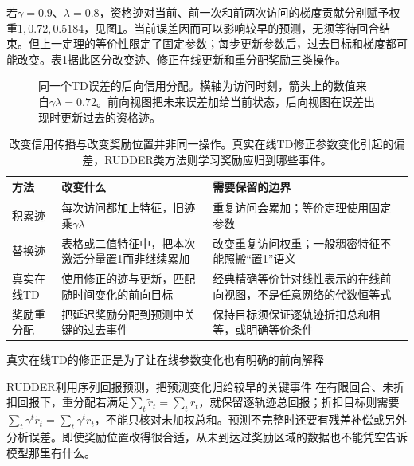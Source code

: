 若$\gamma=0.9$、$\lambda=0.8$，资格迹对当前、前一次和前两次访问的梯度贡献分别赋予权重$1,0.72,0.5184$，见图\ref{fig:rl-learning-traces}。当前误差因而可以影响较早的预测，无须等待回合结束。但上一定理的等价性限定了固定参数；每步更新参数后，过去目标和梯度都可能改变。表\ref{tab:rl-learning-trace-variants}据此区分改变迹、修正在线更新和重分配奖励三类操作。

\begin{figure}[htbp]
  \centering
  
  \caption{同一个TD误差的后向信用分配。横轴为访问时刻，箭头上的数值来自$\gamma\lambda=0.72$。前向视图把未来误差加给当前状态，后向视图在误差出现时更新过去的资格迹。}
  \label{fig:rl-learning-traces}
\end{figure}

\begin{table}[t]
  \centering
  \small
  \begin{tabularx}{\linewidth}{>{\raggedright\arraybackslash}p{26mm} >{\raggedright\arraybackslash}X >{\raggedright\arraybackslash}X}
    \toprule
    方法 & 改变什么 & 需要保留的边界 \\
    \midrule
    积累迹 & 每次访问都加上特征，旧迹乘$\gamma\lambda$ & 重复访问会累加；等价定理使用固定参数 \\
    替换迹 & 表格或二值特征中，把本次激活分量置1而非继续累加 & 改变重复访问权重；一般稠密特征不能照搬“置1”语义 \\
    真实在线TD & 使用修正的迹与更新，匹配随时间变化的前向目标 & 经典精确等价针对线性表示的在线前向视图，不是任意网络的代数恒等式 \\
    奖励重分配 & 把延迟奖励分配到预测中关键的过去事件 & 保持目标须保证逐轨迹折扣总和相等，或明确等价条件 \\
    \bottomrule
  \end{tabularx}
  \caption{改变信用传播与改变奖励位置并非同一操作。真实在线TD修正参数变化引起的偏差，RUDDER类方法则学习奖励应归到哪些事件。}
  \label{tab:rl-learning-trace-variants}
\end{table}

真实在线TD的修正正是为了让在线参数变化也有明确的前向解释

RUDDER利用序列回报预测，把预测变化归给较早的关键事件
在有限回合、未折扣回报下，重分配若满足$\sum_t\widetilde r_t=\sum_t r_t$，就保留逐轨迹总回报；折扣目标则需要$\sum_t\gamma^t\widetilde r_t=\sum_t\gamma^t r_t$，不能只核对未加权总和。预测不完整时还要有残差补偿或另外分析误差。即使奖励位置改得很合适，从未到达过奖励区域的数据也不能凭空告诉模型那里有什么。

